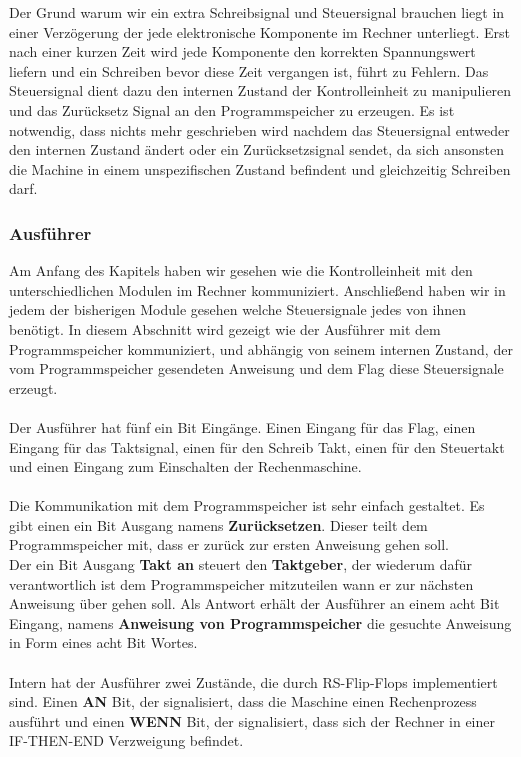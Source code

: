 \documentclass[11pt,a4paper,leqno]{report}
\numberwithin{equation}{chapter}
\begin{document}
\noindent
Der Grund warum wir ein extra Schreibsignal und Steuersignal brauchen liegt in einer Verz\"ogerung der jede elektronische Komponente im Rechner unterliegt. Erst nach einer kurzen Zeit wird jede Komponente den korrekten Spannungswert liefern und ein Schreiben bevor diese Zeit vergangen ist, f\"uhrt zu Fehlern. Das Steuersignal dient dazu den internen Zustand der Kontrolleinheit zu manipulieren und das Zur\"ucksetz Signal an den Programmspeicher zu erzeugen. Es ist notwendig, dass nichts mehr geschrieben wird nachdem das Steuersignal entweder den internen Zustand \"andert oder ein Zur\"ucksetzsignal sendet, da sich ansonsten die Machine in einem unspezifischen Zustand befindent und gleichzeitig Schreiben darf.\\
\subsubsection{Ausf\"uhrer}
Am Anfang des Kapitels haben wir gesehen wie die Kontrolleinheit mit den unterschiedlichen Modulen im Rechner kommuniziert. Anschlie\ss{}end haben wir in jedem der bisherigen Module gesehen welche Steuersignale jedes von ihnen ben\"otigt. In diesem Abschnitt wird gezeigt wie der Ausf\"uhrer mit dem Programmspeicher kommuniziert, und abh\"angig von seinem internen Zustand, der vom Programmspeicher gesendeten Anweisung und dem Flag diese Steuersignale erzeugt. 
\\
\\
Der Ausf\"uhrer hat f\"unf ein Bit Eing\"ange. Einen Eingang f\"ur das Flag, einen Eingang f\"ur das Taktsignal, einen f\"ur den Schreib Takt, einen f\"ur den Steuertakt und einen Eingang zum Einschalten der Rechenmaschine.\\
\\
Die Kommunikation mit dem Programmspeicher ist sehr einfach gestaltet. Es gibt einen ein Bit Ausgang namens \textbf{Zur\"ucksetzen}. Dieser teilt dem Programmspeicher mit, dass er zur\"uck zur ersten Anweisung gehen soll.\\
Der ein Bit Ausgang \textbf{Takt an} steuert den \textbf{Taktgeber}, der wiederum daf\"ur verantwortlich ist dem Programmspeicher mitzuteilen wann er zur n\"achsten Anweisung \"uber gehen soll. Als Antwort erh\"alt der Ausf\"uhrer an einem acht Bit Eingang, namens \textbf{Anweisung von Programmspeicher} die gesuchte Anweisung in Form eines acht Bit Wortes.\\
\\
Intern hat der Ausf\"uhrer zwei Zust\"ande, die durch RS-Flip-Flops implementiert sind. Einen \textbf{AN} Bit, der signalisiert, dass die Maschine einen Rechenprozess ausf\"uhrt und einen \textbf{WENN} Bit, der signalisiert, dass sich der Rechner in einer IF-THEN-END Verzweigung befindet.\\
\end{document}
